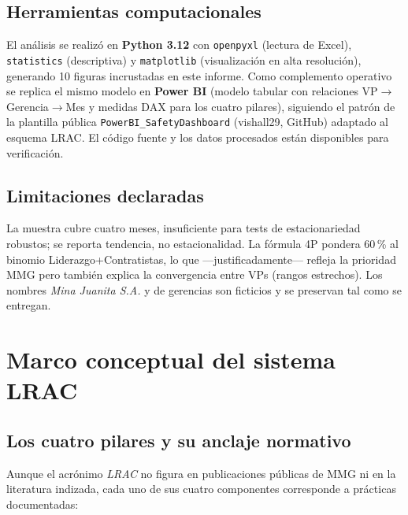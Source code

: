 \documentclass[12pt,a4paper]{article}
\begin{document}
\subsection{Herramientas computacionales}
El análisis se realizó en \textbf{Python 3.12} con \texttt{openpyxl} (lectura de Excel), \texttt{statistics} (descriptiva) y \texttt{matplotlib} (visualización en alta resolución), generando 10 figuras incrustadas en este informe. Como complemento operativo se replica el mismo modelo en \textbf{Power BI} (modelo tabular con relaciones VP$\to$Gerencia$\to$Mes y medidas DAX para los cuatro pilares), siguiendo el patrón de la plantilla pública \texttt{PowerBI\_SafetyDashboard} (vishall29, GitHub) adaptado al esquema LRAC. El código fuente y los datos procesados están disponibles para verificación.

\subsection{Limitaciones declaradas}
La muestra cubre cuatro meses, insuficiente para tests de estacionariedad robustos; se reporta tendencia, no estacionalidad. La fórmula 4P pondera 60\,\% al binomio Liderazgo+Contratistas, lo que ---justificadamente--- refleja la prioridad MMG pero también explica la convergencia entre VPs (rangos estrechos). Los nombres \emph{Mina Juanita S.A.} y de gerencias son ficticios y se preservan tal como se entregan.

\section{Marco conceptual del sistema LRAC}

\subsection{Los cuatro pilares y su anclaje normativo}
Aunque el acrónimo \emph{LRAC} no figura en publicaciones públicas de MMG ni en la literatura indizada, cada uno de sus cuatro componentes corresponde a prácticas documentadas:
\end{document}
